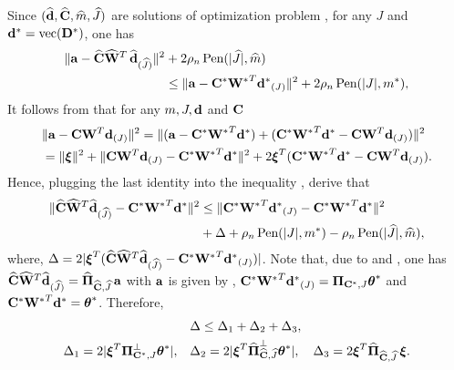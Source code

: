 %
Since $(\widehat{\mathbf{d}}, \widehat{\mathbf{C}}, \widehat{m}, \widehat{J})$ are solutions of optimization problem ,
for any   $J$  and ${\mathbf{d}^*} = \mbox{vec}(\mathbf{D}^*)$,  one has
\begin{align}  \label{new_main_ineq}
\|\ba - \hbC \hbW^T\, \hbd_{(\hJ)}\|^2 & + 2  \rho_n\,  \Pen(|\hJ|,\hm) \\
& \leq \|\ba - \bCs \bWs^T \bds_{(J)} \|^2 + 2  \rho_n\, \Pen(|J|,\ms), \nonumber
\end{align} 
It follows from  that for any $m,J,\mathbf{d}$ and $\mathbf{C}$
\begin{align*} 
& \|\ba -   \bC \bW^T  \bd_{(J)}\|^2  = \|(\ba - \bCs \bWs^T \bds) +  (\bCs \bWs^T \bds -  \bC \bW^T \bd_{(J)})\|^2 \\
& =   \|\bxi\|^2 + \|\bC \bW^T \bd_{(J)} - \bCs \bWs^T \bds\|^2 + 2 \bxi^T (\bCs \bWs^T \bds -  \bC \bW^T \bd_{(J)}).
\end{align*}
Hence, plugging the last identity into the inequality , derive that
\begin{align} \label{new_main_ineq1}
\|\hbC \hbW^T \hbd_{(\hJ)} - \bCs \bWs^T \bds\|^2 & \leq \|\bCs \bWs^T \bds_{(J)} - \bCs \bWs^T \bds\|^2 \\
& +    \Del + \rho_n\, \Pen(|J|,\ms) - \rho_n\, \Pen(|\hJ|,\hm), \nonumber 
\end{align}
%
where, $\Del   = 2 |\bxi^T (\hbC \hbW^T \hbd_{(\hJ)} - \bCs \bWs^T \bds_{(J)})|$. 
Note that, due to  and , one has  $\hbC \hbW^T \hbd_{(\hJ)} = \hPChJ\, \ba$ 
with $\mathbf{a}$ is given by , $\bCs \bWs^T \bds_{(J)} = \PCJs \btes$ and $\bCs \bWs^T \bds = \btes$.  
Therefore,
\begin{align}
  & \Del    \leq  \Del_1 + \Del_2 + \Del_3, \label{new_Del123}\\
  \Del_1   = 2 |\bxi^T \PCJso \btes|, \quad %
  & \Del_2    = 2 |\bxi^T \hPChJo \btes|, \quad  
  \Del_3   = 2  \bxi^T \hPChJ\, \bxi.  \nonumber
\end{align}

